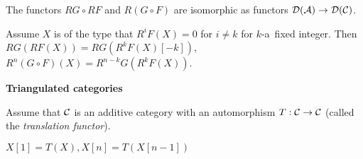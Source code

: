 	\begin{theorem}
		The functors $RG \circ RF$ and $R(G \circ F)$
		are isomorphic as functors $\mathcal{D}(\mathcal{A}) \to \mathcal{D}(\mathcal{C})$.
	\end{theorem}
	
	\begin{remark}
		Assume $X$ is of the type that $R^iF(X)=0$ for $i \neq k$
		for $k$-a~fixed integer.
		Then $RG(RF(X)) = RG(R^kF(X)[-k])$,
		$R^n(G \circ F)(X) = R^{n-k}G(R^kF(X))$.
	\end{remark}
	
	{\bf Triangulated categories}
	
	Assume that $\mathcal{C}$ is an additive category with an automorphism 
	$T:\mathcal{C} \to \mathcal{C}$ (called the {\em translation functor}).
	
	\begin{definition}
		$X[1] = T(X), X[n] = T(X[n-1])$
	\end{definition}
	
